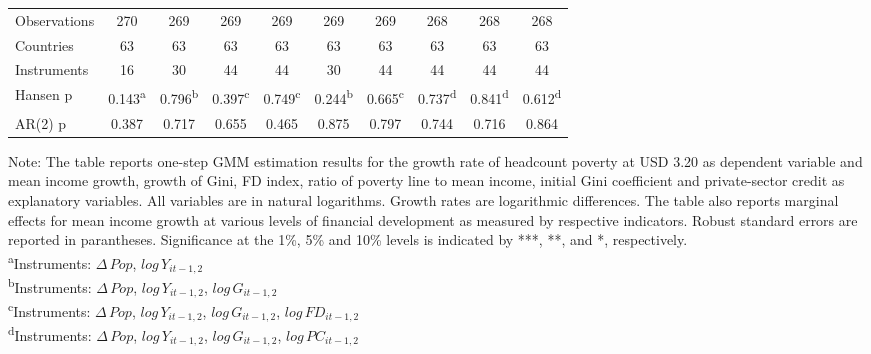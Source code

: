\documentclass[12pt, a4paper]{article}
\begin{document}
\begin{appendices}
\begin{table}[htbp]
\begin{threeparttable}
{\begin{tabular}{l*{9}{c}}
				
				\hline
				Observations        &         270         &         269         &         269         &         269         &         269         &         269         &         268         &         268         &         268         \\
				Countries           &          63         &          63         &          63         &          63         &          63         &          63         &          63         &          63         &          63         \\
				Instruments         &          16         &          30         &          44         &          44         &          30         &          44         &          44         &          44         &          44         \\
				Hansen p         &       0.143\textsuperscript{a}         &       0.796\textsuperscript{b}         &       0.397\textsuperscript{c}         &       0.749\textsuperscript{c}         &       0.244\textsuperscript{b}         &       0.665\textsuperscript{c}         &       0.737\textsuperscript{d}         &       0.841\textsuperscript{d}         &       0.612\textsuperscript{d}         \\
				AR(2) p               &       0.387         &       0.717         &       0.655         &       0.465         &       0.875         &       0.797         &       0.744         &       0.716         &       0.864         \\
				\hline\hline
			\end{tabular}
		}
		\begin{tablenotes}
			\item \scriptsize{Note: The table reports one-step GMM estimation results for the growth rate of headcount poverty at USD 3.20 as dependent variable and mean income growth, growth of Gini, FD index, ratio of poverty line to mean income, initial Gini coefficient and private-sector credit as explanatory variables. All variables are in natural logarithms. Growth rates are logarithmic differences. The table also reports marginal effects for mean income growth at various levels of financial development as measured by respective indicators. Robust standard errors are reported in parantheses. Significance at the 1\%, 5\% and 10\% levels is indicated by ***, **, and *, respectively.\\
				\textsuperscript{a}Instruments: $\Delta \, Pop$, $log \, Y_{it-1,2}$}\\
			\textsuperscript{b}Instruments: $\Delta \, Pop$, $log \, Y_{it-1,2}$, $log \, G_{it-1,2}$\\
			\textsuperscript{c}Instruments: $\Delta \, Pop$, $log \, Y_{it-1,2}$, $log \, G_{it-1,2}$, $log \, FD_{it-1,2}$\\
			\textsuperscript{d}Instruments: $\Delta \, Pop$, $log \, Y_{it-1,2}$, $log \, G_{it-1,2}$, $log \, PC_{it-1,2}$\\
			

\end{tablenotes}
\end{threeparttable}
\end{table}
\end{appendices}
\end{document}
